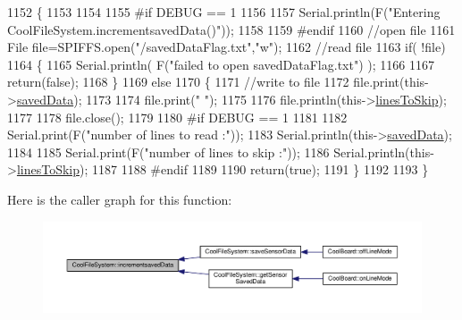 \begin{DoxyCode}
1152 \{
1153 
1154 
1155 \textcolor{preprocessor}{#if DEBUG == 1}
1156     
1157     Serial.println(F(\textcolor{stringliteral}{"Entering CoolFileSystem.incrementsavedData()"}));  
1158     
1159 \textcolor{preprocessor}{#endif}
1160     \textcolor{comment}{//open file}
1161     File file=SPIFFS.open(\textcolor{stringliteral}{"/savedDataFlag.txt"},\textcolor{stringliteral}{"w"});    
1162     \textcolor{comment}{//read file}
1163     \textcolor{keywordflow}{if}( !file)  
1164     \{
1165         Serial.println( F(\textcolor{stringliteral}{"failed to open savedDataFlag.txt"}) );
1166         
1167         \textcolor{keywordflow}{return}(\textcolor{keyword}{false});      
1168     \}
1169     \textcolor{keywordflow}{else}
1170     \{       
1171         \textcolor{comment}{//write to file }
1172         file.print(this->\hyperlink{class_cool_file_system_ad9f5b739a32100f5f21270c3d9ee2b1d}{savedData});
1173         
1174         file.print(\textcolor{stringliteral}{" "});
1175         
1176         file.println(this->\hyperlink{class_cool_file_system_a84fdb6057e534b395512463daa28ea3c}{linesToSkip});
1177     
1178         file.close();
1179 
1180 \textcolor{preprocessor}{    #if DEBUG == 1}
1181 
1182         Serial.print(F(\textcolor{stringliteral}{"number of lines to read :"}));
1183         Serial.println(this->\hyperlink{class_cool_file_system_ad9f5b739a32100f5f21270c3d9ee2b1d}{savedData});
1184     
1185         Serial.print(F(\textcolor{stringliteral}{"number of lines to skip :"}));
1186         Serial.println(this->\hyperlink{class_cool_file_system_a84fdb6057e534b395512463daa28ea3c}{linesToSkip});
1187 
1188 \textcolor{preprocessor}{    #endif}
1189         
1190         \textcolor{keywordflow}{return}(\textcolor{keyword}{true});
1191     \}
1192     
1193 \}
\end{DoxyCode}
Here is the caller graph for this function\+:\nopagebreak
\begin{figure}[H]
\begin{center}
\leavevmode
\includegraphics[width=350pt]{db/d0c/class_cool_file_system_aae045125288f255f3e258073dcada2a6_icgraph}
\end{center}
\end{figure}
\mbox{\label{class_cool_file_system_ac86a40e7c3a1842f7342f698d34324f9}} 
